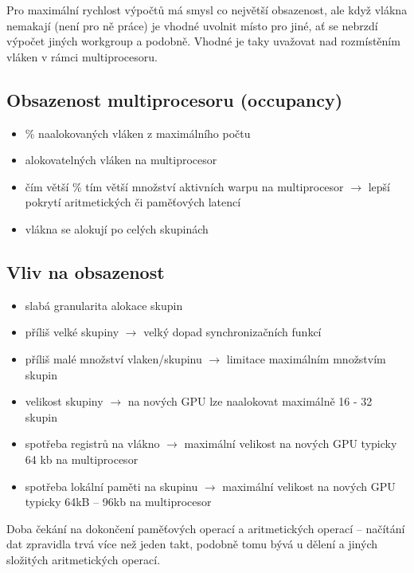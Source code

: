 	Pro maximální rychlost výpočtů má smysl co největší obsazenost, ale když vlákna nemakají (není pro ně práce) je vhodné uvolnit místo pro jiné, ať se nebrzdí výpočet jiných workgroup a podobně. Vhodné je taky uvažovat nad rozmístěním vláken v rámci multiprocesoru.

	\subsection*{Obsazenost multiprocesoru (occupancy)}
		\begin{itemize}
			\setlength\itemsep{0em}
			\item \% naalokovaných vláken z maximálního počtu
			\item alokovatelných vláken na multiprocesor
			\item čím větší \% tím větší množství aktivních warpu na multiprocesor $\rightarrow$ lepší pokrytí aritmetických či paměťových latencí
			\item vlákna se alokují po celých skupinách
		\end{itemize}
	
	\subsection*{Vliv na obsazenost}
		\begin{itemize}
			\setlength\itemsep{0em}
			\item slabá granularita alokace skupin
			\item příliš velké skupiny $\rightarrow$ velký dopad synchronizačních funkcí
			\item příliš malé množství vlaken/skupinu $\rightarrow$ limitace maximálním množstvím skupin
			\item velikost skupiny $\rightarrow$ na nových GPU lze naalokovat maximálně 16 - 32 skupin
			\item spotřeba registrů na vlákno $\rightarrow$ maximální velikost na nových GPU typicky 64 kb na multiprocesor
			\item spotřeba lokální paměti na skupinu $\rightarrow$ maximální velikost na nových GPU typicky 64kB -- 96kb na multiprocesor
		\end{itemize}


	Doba čekání na dokončení paměťových operací a aritmetických operací – načítání dat zpravidla trvá více než jeden takt, podobně tomu bývá u dělení a jiných složitých aritmetických operací.
	
